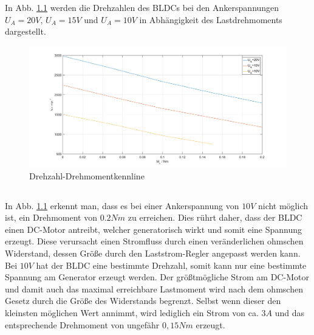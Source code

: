 \chapter{}\label{ex:aufg5}
%
\section{}\label{sec:aufg5a}
%
In Abb. \ref{fig:drehzahldrehm} werden die Drehzahlen des BLDCs bei den Ankerspannungen $U_A = 20V$, $U_A = 15V$ und $U_A = 10V$ in Abhängigkeit des Lastdrehmoments dargestellt.

\begin{figure}[htb]
	\includegraphics[width = \textwidth]{./Bilder/Drehzahldrehmomentkennlinie}
	\caption{Drehzahl-Drehmomentkennline}
	\label{fig:drehzahldrehm}
\end{figure}
%
\section{}\label{sec:aufg5b}
%
In Abb. \ref{fig:drehzahldrehm} erkennt man, dass es bei einer Ankerspannung von $10V$ nicht möglich ist, ein Drehmoment von $0.2 Nm$ zu erreichen. Dies rührt daher, dass der BLDC einen DC-Motor antreibt, welcher generatorisch wirkt und somit eine Spannung erzeugt. Diese verursacht einen Stromfluss durch einen veränderlichen ohmschen Widerstand, dessen Größe durch den Laststrom-Regler angepasst werden kann. Bei $10V$ hat der BLDC eine bestimmte Drehzahl, somit kann nur eine bestimmte Spannung am Generator erzeugt werden. Der größtmögliche Strom am DC-Motor und damit auch das maximal erreichbare Lastmoment wird nach dem ohmschen Gesetz durch die Größe des Widerstands begrenzt. Selbst wenn dieser den kleinsten möglichen Wert annimmt, wird lediglich ein Strom von ca. $3A$ und das entsprechende Drehmoment von ungefähr $0,15Nm$ erzeugt.